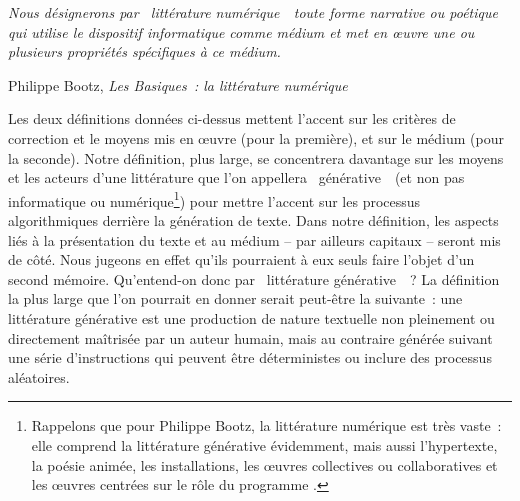 \documentclass{article}
\newenvironment{citationbox}
{\begin{center}
		\begin{minipage}{.8\textwidth}
		}
		{
		\end{minipage}	
\end{center}
}
\begin{document}
			\begin{citationbox}
				\textit{Nous désignerons par \guillemotleft~littérature numérique~\guillemotright~toute forme narrative ou poétique qui utilise le dispositif informatique comme médium et met en œuvre une ou plusieurs propriétés spécifiques à ce médium.}
				\begin{flushright}
					Philippe Bootz, \textit{Les Basiques~: la littérature numérique} \autocite{bootz2006}
				\end{flushright}
			\end{citationbox}
			Les deux définitions données ci-dessus mettent l'accent sur les critères de correction et le moyens mis en œuvre (pour la première), et sur le médium (pour la seconde). Notre définition, plus large, se concentrera davantage sur les moyens et les acteurs d'une littérature que l'on appellera \guillemotleft~générative~\guillemotright~(et non pas informatique ou numérique\footnote{Rappelons que pour Philippe Bootz, la littérature numérique est très vaste~: elle comprend la littérature générative évidemment, mais aussi l’hypertexte, la poésie animée, les installations, les œuvres collectives ou collaboratives et les œuvres centrées sur le rôle du programme \autocite{bootz2006}.}) pour mettre l'accent sur les processus algorithmiques derrière la génération de texte. Dans notre définition, les aspects liés à la présentation du texte et au médium -- par ailleurs capitaux -- seront mis de côté. Nous jugeons en effet qu'ils pourraient à eux seuls faire l'objet d'un second mémoire.
			Qu'entend-on donc par \guillemotleft~littérature générative~\guillemotright~? La définition la plus large que l'on pourrait en donner serait peut-être la suivante~: une littérature générative est une production de nature textuelle non pleinement ou directement maîtrisée par un auteur humain, mais au contraire générée suivant une série d'instructions qui peuvent être déterministes ou inclure des processus aléatoires.\\
			
\end{document}
